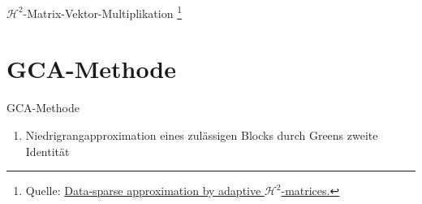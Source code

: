 \documentclass[10pt]{beamer}
\let\svthefootnote\thefootnote
\begin{document}
\begin{frame}{\(\mathcal{H}^2\)-Matrix-Vektor-Multiplikation}
  \footnotesize
  \let\thefootnote\relax\footnote{Quelle: \href{https://link.springer.com/article/10.1007\%2Fs00607-002-1450-4?LI=true}{Data-sparse approximation by adaptive \(\mathcal{H}^2\)-matrices.}}
  \addtocounter{footnote}{-1}\let\thefootnote\svthefootnote\relax
  \normalsize
\end{frame}

\section{GCA-Methode}

\begin{frame}{GCA-Methode}
  \begin{enumerate}
    \item Niedrigrangapproximation eines zulässigen Blocks durch Greens zweite
          Identität
  \end{enumerate}


\end{frame}
\end{document}
